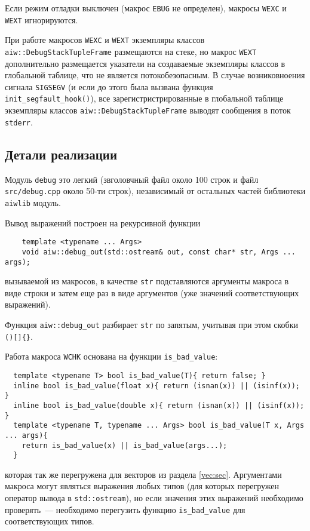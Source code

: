 Если режим отладки выключен (макрос \verb'EBUG' не определен), макросы \verb'WEXC' и \verb'WEXT' игнорируются.

При работе макросов \verb'WEXC' и \verb'WEXT' экземпляры классов  \verb'aiw::DebugStackTupleFrame' размещаются на стеке, но
макрос \verb'WEXT' дополнительно размещается указатели на создаваемые экземпляры классов в глобальной таблице, что не является потокобезопасным. 
В случае возниковноения сигнала \verb'SIGSEGV' (и если до этого была вызвана функция \verb'init_segfault_hook()'),
все зарегистристрированные в глобальной таблице экземпляры классов \verb'aiw::DebugStackTupleFrame' выводят сообщения в поток \verb'stderr'.

\subsection{Детали реализации}
Модуль \verb'debug' это легкий (звголовчный файл около 100 строк и файл \verb'src/debug.cpp' около 50-ти строк),
независимый от остальных частей библиотеки \verb'aiwlib' модуль.

Вывод выражений построен на рекурсивной функции
\begin{verbatim}
    template <typename ... Args> 
    void aiw::debug_out(std::ostream& out, const char* str, Args ... args);
\end{verbatim}
вызываемой из макросов, в качестве \verb'str' подставляются аргументы макроса в виде строки и затем еще раз
в виде аргументов (уже значений соответствующих выражений). 

Функция \verb'aiw::debug_out' разбирает \verb'str' по запятым, учитывая при этом скобки \verb'()[]{}'.


Работа макроса \verb'WCHK' основана на функции \verb'is_bad_value':
\begin{verbatim}
  template <typename T> bool is_bad_value(T){ return false; }
  inline bool is_bad_value(float x){ return (isnan(x)) || (isinf(x)); }
  inline bool is_bad_value(double x){ return (isnan(x)) || (isinf(x)); }
  template <typename T, typename ... Args> bool is_bad_value(T x, Args ... args){
    return is_bad_value(x) || is_bad_value(args...);
  }
\end{verbatim}
которая так же перегружена для векторов из раздела \ref{vec:sec}. Аргументами макроса могут являться выражения любых типов
(для которых перегружен оператор вывода в \verb'std::ostream'), но если значения этих выражений необходимо проверять~--- необходимо перегузить
функцию \verb'is_bad_value' для соответствующих типов.

